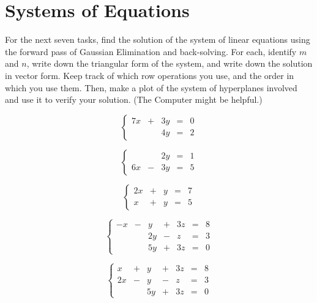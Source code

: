 \documentclass[cahier-main.tex]{subfiles}
\begin{document}
\chapter{Systems of Equations}

For the next seven tasks, find the solution of the system of linear equations using the forward pass of Gaussian Elimination and back-solving. For each, identify $m$ and $n$, write down the triangular form of the system, and write down the solution in vector form. Keep track of which row operations you use, and the order in which you use them. Then, make a plot of the system of hyperplanes involved and use it to verify your solution. (The Computer might be helpful.)

\begin{task}
\[
\left\{\begin{array}{rrrrr}
7x & + & 3y & = & 0 \\
  &  &  4y & = & 2
\end{array}\right.
\]
\end{task}

\begin{task}
\[
\left\{\begin{array}{rrrrr}
& & 2y & = & 1\\
6x & - & 3y & = & 5
\end{array}\right.
\]
\end{task}

\begin{task}
\[
\left\{\begin{array}{rrrrr}
2x & + & y & = & 7 \\
x & + & y & = & 5 
\end{array}\right.
\]
\end{task}


\begin{task}
\[
\left\{\begin{array}{rrrrrrr}
-x & - & y & + & 3z & = & 8 \\
   &  & 2y & - &  z & = & 3 \\
   &  & 5y & + & 3z & = & 0 
\end{array}\right.
\]
\end{task}


\begin{task}
\[
\left\{\begin{array}{rrrrrrr}
 x & + & y & + & 3z & = & 8 \\
2x & - & y & - &  z & = & 3 \\
   &  & 5y & + & 3z & = & 0 
\end{array}\right.
\]
\end{task}
\end{document}

